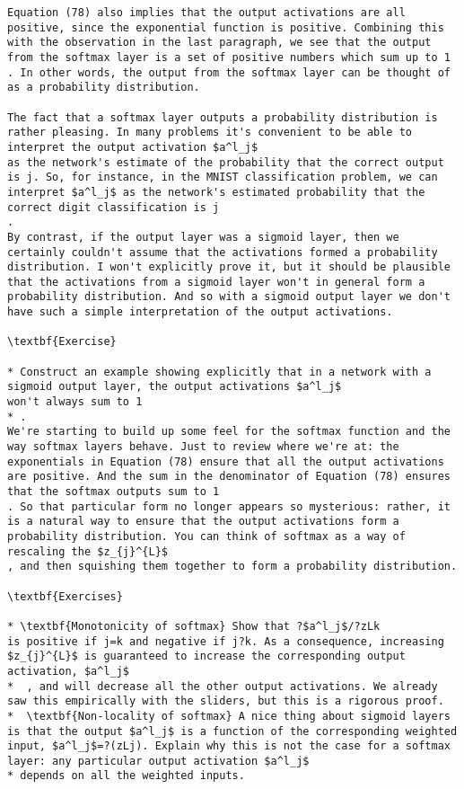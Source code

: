 \begin{lstlisting}
Equation (78) also implies that the output activations are all positive, since the exponential function is positive. Combining this with the observation in the last paragraph, we see that the output from the softmax layer is a set of positive numbers which sum up to 1
. In other words, the output from the softmax layer can be thought of as a probability distribution.

The fact that a softmax layer outputs a probability distribution is rather pleasing. In many problems it's convenient to be able to interpret the output activation $a^l_j$
as the network's estimate of the probability that the correct output is j. So, for instance, in the MNIST classification problem, we can interpret $a^l_j$ as the network's estimated probability that the correct digit classification is j
.
By contrast, if the output layer was a sigmoid layer, then we certainly couldn't assume that the activations formed a probability distribution. I won't explicitly prove it, but it should be plausible that the activations from a sigmoid layer won't in general form a probability distribution. And so with a sigmoid output layer we don't have such a simple interpretation of the output activations.

\textbf{Exercise}

* Construct an example showing explicitly that in a network with a sigmoid output layer, the output activations $a^l_j$
won't always sum to 1
* . 
We're starting to build up some feel for the softmax function and the way softmax layers behave. Just to review where we're at: the exponentials in Equation (78) ensure that all the output activations are positive. And the sum in the denominator of Equation (78) ensures that the softmax outputs sum to 1
. So that particular form no longer appears so mysterious: rather, it is a natural way to ensure that the output activations form a probability distribution. You can think of softmax as a way of rescaling the $z_{j}^{L}$
, and then squishing them together to form a probability distribution.

\textbf{Exercises}

* \textbf{Monotonicity of softmax} Show that ?$a^l_j$/?zLk
is positive if j=k and negative if j?k. As a consequence, increasing $z_{j}^{L}$ is guaranteed to increase the corresponding output activation, $a^l_j$
*  , and will decrease all the other output activations. We already saw this empirically with the sliders, but this is a rigorous proof.
*  \textbf{Non-locality of softmax} A nice thing about sigmoid layers is that the output $a^l_j$ is a function of the corresponding weighted input, $a^l_j$=?(zLj). Explain why this is not the case for a softmax layer: any particular output activation $a^l_j$
* depends on all the weighted inputs. 


\end{lstlisting}
